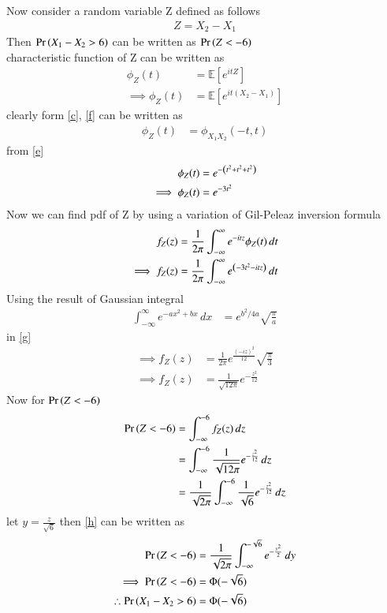 \documentclass[journal,12pt,twocolumn]{IEEEtran}
\begin{document}
Now consider a random variable Z defined as follows
\begin{align}
    Z=X_2-X_1
\end{align}
Then $\Pr\left(X_1-X_2>6\right)$ can be written as $\Pr\left(Z<-6\right)$\\
characteristic function of Z can be written as
\begin{align}
    \phi_Z(t)&=\mathbb{E}[e^{itZ}]\\
    \implies \phi_Z(t)&=\mathbb{E}[e^{it(X_2-X_1)}]
    \label{f}
\end{align}
clearly form \eqref{c}, \eqref{f} can be written as
\begin{align}
    \phi_Z(t)&=\phi_{X_1 X_2}(-t,t)
\end{align}
from \eqref{e}
\begin{align}
    \phi_Z(t)&=e^{-\left(t^2+t^2+t^2\right)}\\
    \implies \phi_Z(t)&=e^{-3t^2}
\end{align}
Now we can find pdf of Z by using a variation of Gil-Peleaz inversion formula
\begin{align}
    f_Z(z)&=\frac{1}{2\pi}\int_{-\infty}^{\infty}e^{-itz}\phi_Z(t)\,dt\\
    \implies f_Z(z)&=\frac{1}{2\pi}\int_{-\infty}^{\infty}e^{\left(-3t^2-itz\right)}\,dt
    \label{g}
\end{align}
Using the result of Gaussian integral
\begin{align}
    \int_{-\infty}^{\infty}e^{-ax^2+bx}\,dx &= e^{b^2/4a}\sqrt{\frac{\pi}{a}}
\end{align}
in \eqref{g}
\begin{align}
    \implies f_Z(z) &= \frac{1}{2\pi}e^{\frac{(-iz)^2}{12}}\sqrt{\frac{\pi}{3}}\\
    \implies f_Z(z) &= \frac{1}{\sqrt{12\pi}}e^{-\frac{{z}^2}{12}}
\end{align}
Now for $\Pr\left(Z<-6\right)$
\begin{align}
    \Pr\left(Z<-6\right)&=\int_{-\infty}^{-6}f_Z(z)\,dz\\
             &=\int_{-\infty}^{-6}\frac{1}{ \sqrt{12\pi}}e^{-\frac{{z}^2}{12}}\,dz\\
             &=\frac{1}{ \sqrt{2\pi}}\int_{-\infty}^{-6}\frac{1}{ \sqrt{6}}e^{-\frac{{z}^2}{12}}\,dz
             \label{h}
\end{align}
let $y=\frac{z}{\sqrt{6}}$ then \eqref{h} can be written as
\begin{align}
    \Pr\left(Z<-6\right)&=\frac{1}{ \sqrt{2\pi}}\int_{-\infty}^{-\sqrt{6}}e^{-\frac{{y}^2}{2}}\,dy\\
    \implies \Pr\left(Z<-6\right)&=\Phi(-\sqrt{6})\\
    \therefore \Pr\left(X_1-X_2>6\right)&=\Phi(-\sqrt{6})
\end{align}
\end{document}
